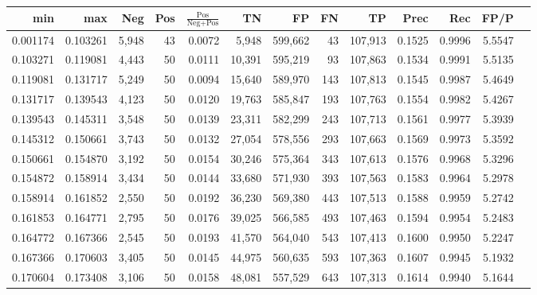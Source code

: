\begin{tabular}{rrrrrrrrrrrrr}
\toprule
     min &      max &   Neg & Pos & $\frac{\text{Pos}}{\text{Neg}+\text{Pos}}$ &      TN &      FP &      FN &      TP &   Prec &    Rec &   FP/P \\
\midrule
0.001174 & 0.103261 & 5,948 &  43 &                                     0.0072 &   5,948 & 599,662 &      43 & 107,913 & 0.1525 & 0.9996 & 5.5547 \\
0.103271 & 0.119081 & 4,443 &  50 &                                     0.0111 &  10,391 & 595,219 &      93 & 107,863 & 0.1534 & 0.9991 & 5.5135 \\
0.119081 & 0.131717 & 5,249 &  50 &                                     0.0094 &  15,640 & 589,970 &     143 & 107,813 & 0.1545 & 0.9987 & 5.4649 \\
0.131717 & 0.139543 & 4,123 &  50 &                                     0.0120 &  19,763 & 585,847 &     193 & 107,763 & 0.1554 & 0.9982 & 5.4267 \\
0.139543 & 0.145311 & 3,548 &  50 &                                     0.0139 &  23,311 & 582,299 &     243 & 107,713 & 0.1561 & 0.9977 & 5.3939 \\
0.145312 & 0.150661 & 3,743 &  50 &                                     0.0132 &  27,054 & 578,556 &     293 & 107,663 & 0.1569 & 0.9973 & 5.3592 \\
0.150661 & 0.154870 & 3,192 &  50 &                                     0.0154 &  30,246 & 575,364 &     343 & 107,613 & 0.1576 & 0.9968 & 5.3296 \\
0.154872 & 0.158914 & 3,434 &  50 &                                     0.0144 &  33,680 & 571,930 &     393 & 107,563 & 0.1583 & 0.9964 & 5.2978 \\
0.158914 & 0.161852 & 2,550 &  50 &                                     0.0192 &  36,230 & 569,380 &     443 & 107,513 & 0.1588 & 0.9959 & 5.2742 \\
0.161853 & 0.164771 & 2,795 &  50 &                                     0.0176 &  39,025 & 566,585 &     493 & 107,463 & 0.1594 & 0.9954 & 5.2483 \\
0.164772 & 0.167366 & 2,545 &  50 &                                     0.0193 &  41,570 & 564,040 &     543 & 107,413 & 0.1600 & 0.9950 & 5.2247 \\
0.167366 & 0.170603 & 3,405 &  50 &                                     0.0145 &  44,975 & 560,635 &     593 & 107,363 & 0.1607 & 0.9945 & 5.1932 \\
0.170604 & 0.173408 & 3,106 &  50 &                                     0.0158 &  48,081 & 557,529 &     643 & 107,313 & 0.1614 & 0.9940 & 5.1644 \\

\end{tabular}
